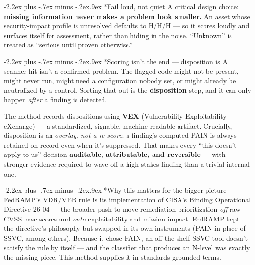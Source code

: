 \documentclass[11pt]{article}
\makeatletter
\renewcommand\section{\@startsection{section}{1}{\z@}%
  {-2.2ex plus -.7ex minus -.2ex}{.9ex}%
  {\normalfont\Large\bfseries}}
\makeatother
\begin{document}
\section*{Fail loud, not quiet}
A critical design choice: \textbf{missing information never makes a problem look
smaller.} An asset whose security-impact profile is unresolved defaults to H/H/H
--- so it scores loudly and surfaces itself for assessment, rather than hiding in
the noise. ``Unknown'' is treated as ``serious until proven otherwise.''

\section*{Scoring isn't the end --- disposition is}
A scanner hit isn't a confirmed problem. The flagged code might not be present,
might never run, might need a configuration nobody set, or might already be
neutralized by a control. Sorting that out is the \textbf{disposition} step, and it
can only happen \emph{after} a finding is detected.

The method records dispositions using \textbf{VEX} (Vulnerability Exploitability
eXchange) --- a standardized, signable, machine-readable artifact. Crucially,
disposition is an \emph{overlay, not a re-score}: a finding's computed PAIN is
always retained on record even when it's suppressed. That makes every ``this
doesn't apply to us'' decision \textbf{auditable, attributable, and reversible} ---
with stronger evidence required to wave off a high-stakes finding than a trivial
internal one.

\section*{Why this matters for the bigger picture}
FedRAMP's VDR/VER rule is its implementation of CISA's Binding Operational
Directive 26-04 --- the broader push to move remediation prioritization \emph{off}
raw CVSS base scores and \emph{onto} exploitability and mission impact. FedRAMP
kept the directive's philosophy but swapped in its own instruments (PAIN in place
of SSVC, among others). Because it chose PAIN, an off-the-shelf SSVC tool doesn't
satisfy the rule by itself --- and the classifier that produces an N-level was
exactly the missing piece. This method supplies it in standards-grounded terms.
\end{document}
